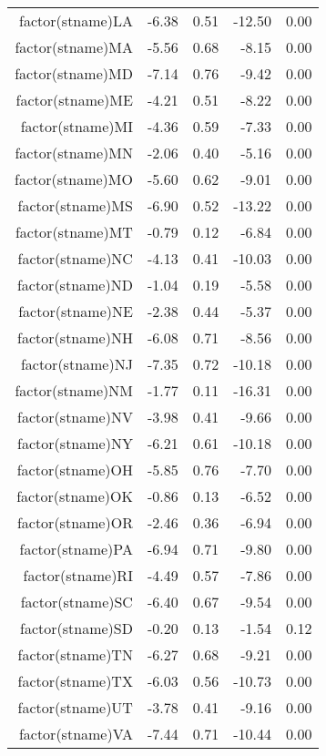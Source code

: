 \begin{table}[ht]
\begin{tabular}{rrrrr}
  factor(stname)LA & -6.38 & 0.51 & -12.50 & 0.00 \\ 
  factor(stname)MA & -5.56 & 0.68 & -8.15 & 0.00 \\ 
  factor(stname)MD & -7.14 & 0.76 & -9.42 & 0.00 \\ 
  factor(stname)ME & -4.21 & 0.51 & -8.22 & 0.00 \\ 
  factor(stname)MI & -4.36 & 0.59 & -7.33 & 0.00 \\ 
  factor(stname)MN & -2.06 & 0.40 & -5.16 & 0.00 \\ 
  factor(stname)MO & -5.60 & 0.62 & -9.01 & 0.00 \\ 
  factor(stname)MS & -6.90 & 0.52 & -13.22 & 0.00 \\ 
  factor(stname)MT & -0.79 & 0.12 & -6.84 & 0.00 \\ 
  factor(stname)NC & -4.13 & 0.41 & -10.03 & 0.00 \\ 
  factor(stname)ND & -1.04 & 0.19 & -5.58 & 0.00 \\ 
  factor(stname)NE & -2.38 & 0.44 & -5.37 & 0.00 \\ 
  factor(stname)NH & -6.08 & 0.71 & -8.56 & 0.00 \\ 
  factor(stname)NJ & -7.35 & 0.72 & -10.18 & 0.00 \\ 
  factor(stname)NM & -1.77 & 0.11 & -16.31 & 0.00 \\ 
  factor(stname)NV & -3.98 & 0.41 & -9.66 & 0.00 \\ 
  factor(stname)NY & -6.21 & 0.61 & -10.18 & 0.00 \\ 
  factor(stname)OH & -5.85 & 0.76 & -7.70 & 0.00 \\ 
  factor(stname)OK & -0.86 & 0.13 & -6.52 & 0.00 \\ 
  factor(stname)OR & -2.46 & 0.36 & -6.94 & 0.00 \\ 
  factor(stname)PA & -6.94 & 0.71 & -9.80 & 0.00 \\ 
  factor(stname)RI & -4.49 & 0.57 & -7.86 & 0.00 \\ 
  factor(stname)SC & -6.40 & 0.67 & -9.54 & 0.00 \\ 
  factor(stname)SD & -0.20 & 0.13 & -1.54 & 0.12 \\ 
  factor(stname)TN & -6.27 & 0.68 & -9.21 & 0.00 \\ 
  factor(stname)TX & -6.03 & 0.56 & -10.73 & 0.00 \\ 
  factor(stname)UT & -3.78 & 0.41 & -9.16 & 0.00 \\ 
  factor(stname)VA & -7.44 & 0.71 & -10.44 & 0.00 \\ 

\end{tabular}
\end{table}
